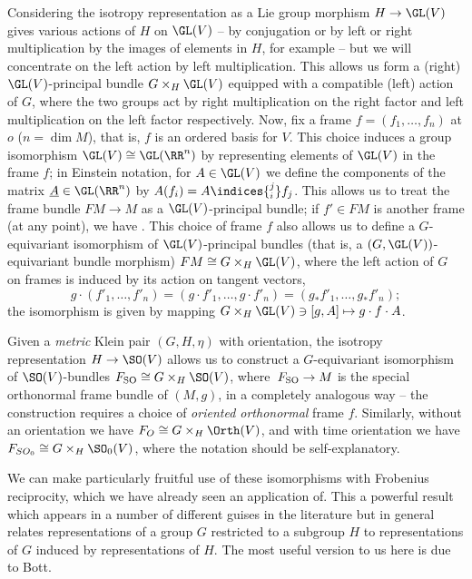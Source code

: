 Considering the isotropy representation as a Lie group morphism $H\to\GL(V)$ gives various actions of $H$ on $\GL(V)$ -- by conjugation or by left or right multiplication by the images of elements in $H$, for example -- but we will concentrate on the left action by left multiplication. This allows us form a (right) $\GL(V)$-principal bundle $G\times_H \GL(V)$ equipped with a compatible (left) action of $G$, where the two groups act by right multiplication on the right factor and left multiplication on the left factor respectively. Now, fix a frame $f=(f_1,\dots,f_n)$ at $o$ ($n=\dim M$), that is, $f$ is an ordered basis for $V$. This choice induces a group isomorphism $\GL(V)\cong\GL(\RR^n)$ by representing elements of $\GL(V)$ in the frame $f$; in Einstein notation, for $A\in\GL(V)$ we define the components of the matrix $\underline{A}\in \GL(\RR^n)$ by $A(f_i)=A\indices{^j_i}f_j$. This allows us to treat the frame bundle $FM\to M$ as a $\GL(V)$-principal bundle; if $f'\in FM$ is another frame (at any point), we have
.
This choice of frame $f$ also allows us to define a $G$-equivariant isomorphism of $\GL(V)$-principal bundles (that is, a $(G,\GL(V))$-equivariant bundle morphism)
$FM \cong G\times_H \GL(V)$,
where the left action of $G$ on frames is induced by its action on tangent vectors,
\[%
	g\cdot (f'_1,\dots,f'_n) = (g\cdot f'_1,\dots,g\cdot f'_n) = (g_*f'_1,\dots,g_*f'_n);
\]
the isomorphism is given by mapping $G\times_H \GL(V)\ni [g,A]\mapsto g\cdot f \cdot A$.

Given a \emph{metric} Klein pair $(G,H,\eta)$ with orientation, the isotropy representation $H\to\SO(V)$ allows us to construct a $G$-equivariant isomorphism of $\SO(V)$-bundles
$F_{\rm SO} \cong G\times_H \SO(V)$,
where~${F_{\rm SO}\to M}$ is the special orthonormal frame bundle of $(M,g)$, in a completely analogous way -- the construction requires a choice of \emph{oriented orthonormal} frame $f$. Similarly, without an orientation we have $F_O\cong G\times_H\Orth(V)$, and with time orientation we have $F_{SO_0}\cong G\times_H\SO_0(V)$, where the notation should be self-explanatory.

We can make particularly fruitful use of these isomorphisms with Frobenius reciprocity, which we have already seen an application of. This a powerful result which appears in a number of different guises in the literature but in general relates representations of a group $G$ restricted to a subgroup $H$ to representations of $G$ induced by representations of $H$. The most useful version to us here is due to Bott.

